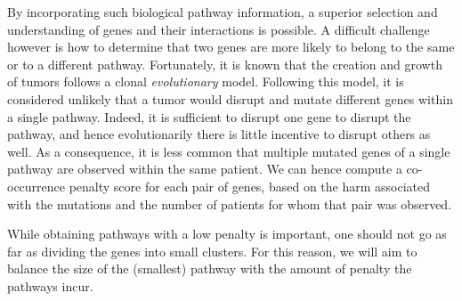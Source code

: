 \documentclass[conference]{IEEEtran}
\begin{document}
By incorporating such biological pathway information, a superior selection and understanding of genes and their interactions is possible. %
%
A difficult challenge however is how to determine that two genes are more likely to belong to the same or to a different pathway. Fortunately, it is known that the creation and growth of tumors follows a clonal \textit{evolutionary} model. Following this model, it is considered unlikely that a tumor would disrupt and mutate different genes within a single pathway. Indeed, it is sufficient to disrupt one gene to disrupt the pathway, and hence evolutionarily there is little incentive to disrupt others as well. As a consequence, it is less common that multiple mutated genes of a single pathway are observed within the same patient. We can hence compute a co-occurrence penalty score for each pair of genes, based on the harm associated with the mutations and the number of patients for whom that pair was observed.

While obtaining pathways with a low penalty is important, one should not go as far as dividing the genes into small clusters. For this reason, we will aim to balance the size of the (smallest) pathway with the amount of penalty the pathways incur.
\end{document}

